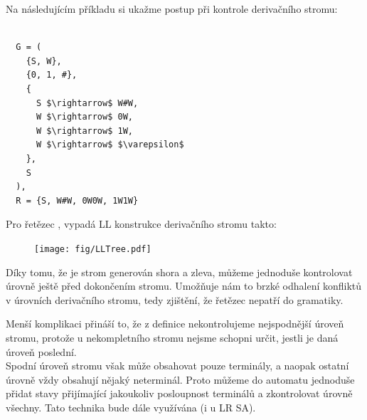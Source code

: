 \noindent
Na následujícím příkladu si ukažme postup při kontrole derivačního stromu:
\begin{exmp}
  \label{exmp:WW}
  \begin{lstlisting}

  G = (
    {S, W},
    {0, 1, #},
    {
      S $\rightarrow$ W#W,
      W $\rightarrow$ 0W,
      W $\rightarrow$ 1W,
      W $\rightarrow$ $\varepsilon$
    },
    S
  ),
  R = {S, W#W, 0W0W, 1W1W}
  \end{lstlisting}

  \noindent
  Pro řetězec , vypadá LL konstrukce derivačního stromu takto:

  \begin{figure}[H]
    \centering
    \texttt{[image: fig/LLTree.pdf]}
  \end{figure}

  Díky tomu, že je strom generován shora a zleva, můžeme jednoduše
  kontrolovat úrovně ještě před dokončením stromu. Umožňuje nám to brzké
  odhalení konfliktů v úrovních derivačního stromu, tedy zjištění, že řetězec
  nepatří do gramatiky.\\

\end{exmp}

Menší komplikaci přináší to, že z definice nekontrolujeme
nejspodnější úroveň stromu, protože u nekompletního stromu nejsme schopni určit,
jestli je daná úroveň poslední.\\
Spodní úroveň stromu však může obsahovat pouze terminály, a naopak
ostatní úrovně vždy obsahují nějaký neterminál. Proto můžeme do automatu
jednoduše přidat stavy přijímající jakoukoliv posloupnost terminálů a
zkontrolovat úrovně všechny. Tato technika bude dále využívána (i u LR SA).\\

